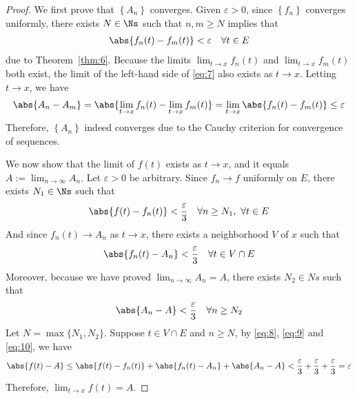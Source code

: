 \documentclass[thmcnt=section, 12pt]{elegantbook}
\begin{document}
\begin{proof}
    We first prove that $\left\{A_n\right\}$ converges. Given $\varepsilon > 0$, since $\left\{f_n\right\}$ converges uniformly, there exists $N \in \Ns$ such that $n, m \geq N$ implies that 
    \begin{align}
        \abs{f_n(t) - f_m(t)} < \varepsilon \quad 
        \forall t \in E
        \label{eq:7}
    \end{align}
    due to Theorem~\ref{thm:6}. Because the limits $\lim_{t \to x} f_n(t)$ and $\lim_{t \to x} f_m(t)$ both exist, the limit of the left-hand side of \eqref{eq:7} also exists as $t \to x$. Letting $t \to x$, we have
    \begin{align*}
        \abs{A_n - A_m}
        = \abs{\lim_{t \to x} f_n(t) - \lim_{t \to x} f_m(t)}
        = \lim_{t \to x} \abs{f_n(t) - f_m(t)} 
        \leq \varepsilon
    \end{align*}
    Therefore, $\left\{A_n\right\}$ indeed converges due to the Cauchy criterion for convergence of sequences.
    
    \par We now show that the limit of $f(t)$ exists as $t \to x$, and it equals $A := \lim_{n \to \infty} A_n$. Let $\varepsilon > 0$ be arbitrary. Since $f_n \to f$ uniformly on $E$, there exists $N_1 \in \Ns$ such that 
    \begin{align}
        \abs{f(t) - f_n(t)} < \frac{\varepsilon}{3} \quad \forall n \geq N_1, \ \forall t \in E
        \label{eq:8}
    \end{align}
    And since $f_n(t) \to A_n$ as $t \to x$, there exists a neighborhood $V$ of $x$ such that 
    \begin{align}
        \abs{f_n(t) - A_n} < \frac{\varepsilon}{3} \quad \forall t \in V \cap E
        \label{eq:9}
    \end{align}
    Moreover, because we have proved $\lim_{n \to \infty} A_n = A$, there exists $N_2 \in Ns$ such that
    \begin{align}
        \abs{A_n - A} < \frac{\varepsilon}{3} \quad \forall n \geq N_2
        \label{eq:10}
    \end{align}
    Let $N = \max\{N_1, N_2\}$. Suppose $t \in V \cap E$ and $n \geq N$, by \eqref{eq:8}, \eqref{eq:9} and \eqref{eq:10}, we have
    \begin{align*}
        \abs{f(t) - A}
        \leq \abs{f(t) - f_n(t)}
        + \abs{f_n(t) - A_n}
        + \abs{A_n - A} 
        < \frac{\varepsilon}{3} + \frac{\varepsilon}{3} + \frac{\varepsilon}{3}
        = \varepsilon
    \end{align*}
    Therefore, $\lim_{t \to x} f(t) = A$.
\end{proof}
\end{document}
